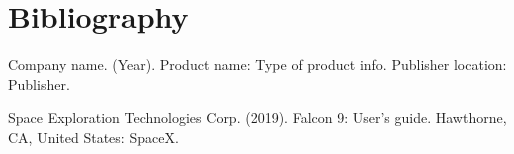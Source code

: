 \chapter{Bibliography}
 

Company name. (Year). Product name: Type of product info. Publisher location: Publisher.

Space Exploration Technologies Corp. (2019). Falcon 9: User's guide. Hawthorne, CA, United States: SpaceX.


